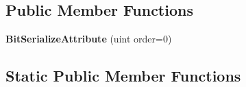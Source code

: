 \subsection*{Public Member Functions}
\begin{DoxyCompactItemize}
\item 
\hypertarget{class_skyrates_1_1_common_1_1_network_1_1_bit_serialize_attribute_a81f2c7592f9dc71172b819000769b08d}{{\bfseries Bit\-Serialize\-Attribute} (uint order=0)}\label{class_skyrates_1_1_common_1_1_network_1_1_bit_serialize_attribute_a81f2c7592f9dc71172b819000769b08d}

\end{DoxyCompactItemize}
\subsection*{Static Public Member Functions}
